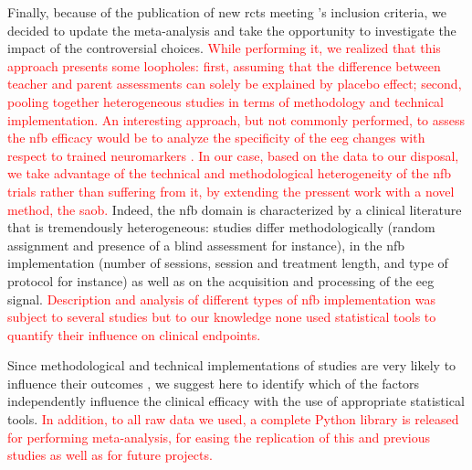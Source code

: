 Finally, because of the publication of new \glspl{rct} meeting \citeauthor{Cortese2016}'s inclusion criteria, we
decided to update the meta-analysis and take the opportunity to investigate the impact of the controversial choices.
\textcolor{red}{While performing it, we realized that this approach presents some loopholes: first, assuming that the difference between teacher and parent
assessments can solely be explained by placebo effect; second, pooling together heterogeneous studies in terms of methodology and technical
implementation. An interesting approach, but not commonly performed, to assess the \gls{nfb} efficacy would be to analyze the specificity of the \gls{eeg} changes with respect 
to trained neuromarkers \citep{Maurizio2014}. In our case, based on the data to our disposal, we take advantage of the technical and methodological heterogeneity 
of the \gls{nfb} trials rather than suffering from it, by extending the pressent work with a novel method, the \gls{saob}.} Indeed, the \gls{nfb} domain is 
characterized by a clinical literature that is tremendously heterogeneous: studies differ methodologically (random assignment and 
presence of a blind assessment for instance), in the \gls{nfb} implementation (number of sessions, session and treatment length,
and type of protocol for instance) as well as on the acquisition and processing of the \gls{eeg} signal. \textcolor{red}{Description and analysis of different types 
of \gls{nfb} implementation was subject to several studies \citep{Arns2014, Enriquez2017, Vernon2004, Jeunet2018} but to our knowledge none used statistical 
tools to quantify their influence on clinical endpoints.}

Since methodological and technical implementations of studies are very likely to influence their outcomes \citep{Congedo2004}, we suggest 
here to identify which of the factors independently influence the clinical efficacy with the use of appropriate statistical tools. 
\textcolor{red}{In addition, to all raw data we used, a complete Python library is released for performing meta-analysis, for easing the replication of 
this and previous studies as well as for future projects.}







